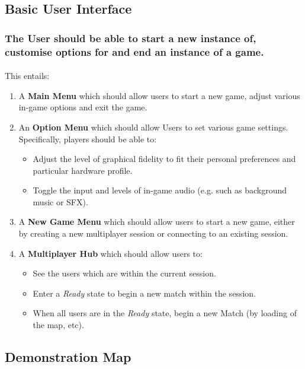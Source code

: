 \documentclass{article}
\begin{document}
\subsection{Basic User Interface}
\subsubsection{\textbf{The User should be able to start a new instance of, customise options for and end an instance of a game.}}
\paragraph{}This entails:

\begin{enumerate}
  \item A \textbf{Main Menu} which should allow users to start a new game, adjust various in-game options and exit the game.
  \item An \textbf{Option Menu} which should allow Users to set various game settings. Specifically, players should be able to:
  
  \begin{itemize}
      \item Adjust the level of graphical fidelity to fit their personal preferences and particular hardware profile.
      \item Toggle the input and levels of in-game audio (e.g. such as background music or SFX).
  \end{itemize}
  
 \item A \textbf{New Game Menu} which should allow users to start a new game, either by creating a new multiplayer session or connecting to an existing session.
 \item A \textbf{Multiplayer Hub} which should allow users to:
 
  \begin{itemize}
      \item See the users which are within the current session.
      \item Enter a \textit{Ready} state to begin a new match within the session.
      \item When all users are in the \textit{Ready} state, begin a new Match (by loading of the map, etc).
  \end{itemize}
\end{enumerate}

\subsection{Demonstration Map}
\end{document}
